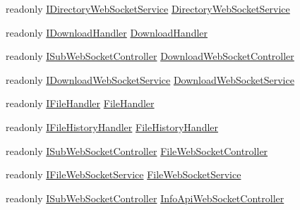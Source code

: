 \begin{DoxyCompactItemize}
readonly \mbox{\hyperlink{interface_little_weeb_library_1_1_services_1_1_i_directory_web_socket_service}{I\+Directory\+Web\+Socket\+Service}} \mbox{\hyperlink{class_little_weeb_library_1_1_start_up_a84bf27f74487f7ca69ddb0620378a0a8}{Directory\+Web\+Socket\+Service}}
\item 
readonly \mbox{\hyperlink{interface_little_weeb_library_1_1_handlers_1_1_i_download_handler}{I\+Download\+Handler}} \mbox{\hyperlink{class_little_weeb_library_1_1_start_up_a03db7121ba274462aa88a7aee4110296}{Download\+Handler}}
\item 
readonly \mbox{\hyperlink{interface_little_weeb_library_1_1_controllers_1_1_i_sub_web_socket_controller}{I\+Sub\+Web\+Socket\+Controller}} \mbox{\hyperlink{class_little_weeb_library_1_1_start_up_ad5421fcdf8aae805b8331bd0e9034f39}{Download\+Web\+Socket\+Controller}}
\item 
readonly \mbox{\hyperlink{interface_little_weeb_library_1_1_services_1_1_i_download_web_socket_service}{I\+Download\+Web\+Socket\+Service}} \mbox{\hyperlink{class_little_weeb_library_1_1_start_up_ae6133ff8a65bb66f7525066878e4bce1}{Download\+Web\+Socket\+Service}}
\item 
readonly \mbox{\hyperlink{interface_little_weeb_library_1_1_handlers_1_1_i_file_handler}{I\+File\+Handler}} \mbox{\hyperlink{class_little_weeb_library_1_1_start_up_a294aca8837f3c631a94f0674efd377fb}{File\+Handler}}
\item 
readonly \mbox{\hyperlink{interface_little_weeb_library_1_1_handlers_1_1_i_file_history_handler}{I\+File\+History\+Handler}} \mbox{\hyperlink{class_little_weeb_library_1_1_start_up_a2bc39d9594dd6eab424fb6c2df64ae33}{File\+History\+Handler}}
\item 
readonly \mbox{\hyperlink{interface_little_weeb_library_1_1_controllers_1_1_i_sub_web_socket_controller}{I\+Sub\+Web\+Socket\+Controller}} \mbox{\hyperlink{class_little_weeb_library_1_1_start_up_a98e8d01c4660f0288eb114f2a11c8d4d}{File\+Web\+Socket\+Controller}}
\item 
readonly \mbox{\hyperlink{interface_little_weeb_library_1_1_services_1_1_i_file_web_socket_service}{I\+File\+Web\+Socket\+Service}} \mbox{\hyperlink{class_little_weeb_library_1_1_start_up_a5e64330715e64985065209ba09a5740d}{File\+Web\+Socket\+Service}}
\item 
readonly \mbox{\hyperlink{interface_little_weeb_library_1_1_controllers_1_1_i_sub_web_socket_controller}{I\+Sub\+Web\+Socket\+Controller}} \mbox{\hyperlink{class_little_weeb_library_1_1_start_up_a85ff0dfe3a4216d8ebdc822744566cb3}{Info\+Api\+Web\+Socket\+Controller}}

\end{DoxyCompactItemize}
